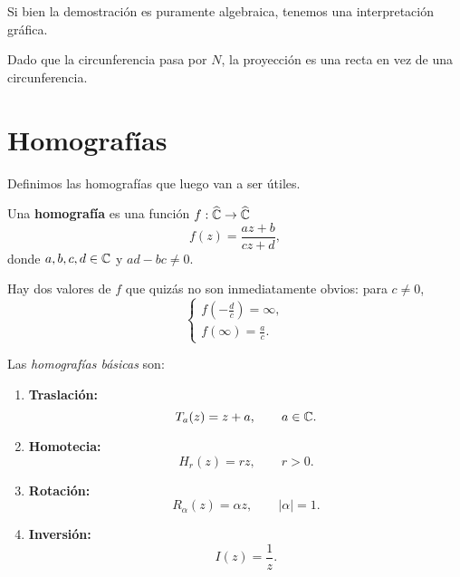 Si bien la demostración es puramente algebraica, tenemos una interpretación gráfica.



Dado que la circunferencia pasa por $N$, la proyección es una recta en vez de una circunferencia.


\section{Homografías}

Definimos las homografías que luego van a ser útiles.

\begin{definition}
    Una \textbf{homografía} es una función $f : \widehat{\mathbb{C}} \to \widehat{\mathbb{C}}$
    \begin{equation*}
        f(z) = \frac{az+b}{cz+d},
    \end{equation*}
    donde $a,b,c,d \in \mathbb{C}$ y $ad - bc \neq 0$.
\end{definition}

Hay dos valores de $f$ que quizás no son inmediatamente obvios: para $c \neq 0$,
\begin{equation*}
    \begin{cases}
        f(-\frac{d}{c}) = \infty, \\
        f(\infty) = \frac{a}{c}.
    \end{cases}
\end{equation*}

Las \textit{homografías básicas} son:
\begin{enumerate}
    \item \textbf{Traslación:} 
    \begin{equation*}
        T_a(z) = z + a, \qquad a \in \mathbb{C}.
    \end{equation*}
    \item \textbf{Homotecia:} 
    \begin{equation*}
        H_r(z) = r z, \qquad r > 0.
    \end{equation*}
    \item \textbf{Rotación:} 
    \begin{equation*}
        R_\alpha(z) = \alpha z, \qquad |\alpha| = 1.
    \end{equation*}
    \item \textbf{Inversión:} 
    \begin{equation*}
        I(z) = \frac{1}{z}.
    \end{equation*}
\end{enumerate}

